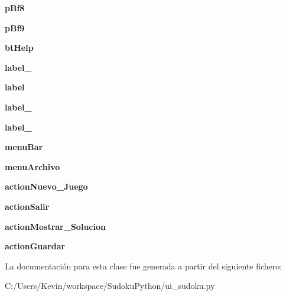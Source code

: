 \begin{DoxyCompactItemize}
\item 
{\bfseries p\-Bf8}\label{classui__sudoku_1_1_ui___sudoku_afe9cddecea36350c214cfc15a21b4c96}

\item 
{\bfseries p\-Bf9}\label{classui__sudoku_1_1_ui___sudoku_a9619bb01455b1f53d8c608b538d2c079}

\item 
{\bfseries bt\-Help}\label{classui__sudoku_1_1_ui___sudoku_a81b9e3c1660226443fa6bec0bee23757}

\item 
{\bfseries label\-\_}\label{classui__sudoku_1_1_ui___sudoku_abca320418644674c78c90113caa9d007}

\item 
{\bfseries label}\label{classui__sudoku_1_1_ui___sudoku_a5ff3ec94e5146b1e44d91cc6c6cff0df}

\item 
{\bfseries label\-\_}\label{classui__sudoku_1_1_ui___sudoku_a09be504022ccbdf442f44d9216f4c4f0}

\item 
{\bfseries label\-\_}\label{classui__sudoku_1_1_ui___sudoku_afeca417cad8816ec1d71d9f1a8e98d8b}

\item 
{\bfseries menu\-Bar}\label{classui__sudoku_1_1_ui___sudoku_abbddb844a0b7c26a8a04d2ee23afe483}

\item 
{\bfseries menu\-Archivo}\label{classui__sudoku_1_1_ui___sudoku_a1fbe1c494eb2ce64065f0ae57aad1945}

\item 
{\bfseries action\-Nuevo\-\_\-\-Juego}\label{classui__sudoku_1_1_ui___sudoku_af204cd509001d0f55ee9dafbe94d458d}

\item 
{\bfseries action\-Salir}\label{classui__sudoku_1_1_ui___sudoku_a9115deb8db150443670a16146c6b4c49}

\item 
{\bfseries action\-Mostrar\-\_\-\-Solucion}\label{classui__sudoku_1_1_ui___sudoku_a5bcdb6d83bf7f25b8f3340194595322f}

\item 
{\bfseries action\-Guardar}\label{classui__sudoku_1_1_ui___sudoku_a4c7efdf64560c6a4e4fa22da0abeed97}

\end{DoxyCompactItemize}


La documentación para esta clase fue generada a partir del siguiente fichero\-:\begin{DoxyCompactItemize}
\item 
C\-:/\-Users/\-Kevin/workspace/\-Sudoku\-Python/ui\-\_\-sudoku.\-py\end{DoxyCompactItemize}
